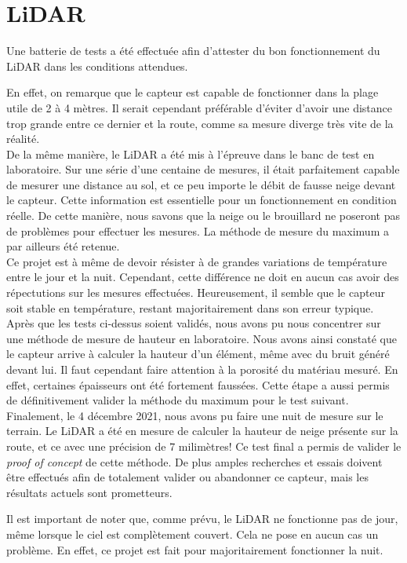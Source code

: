 \section{LiDAR}
Une batterie de tests a été effectuée afin d'attester du bon fonctionnement du LiDAR dans les conditions
attendues.\par
En effet, on remarque que le capteur est capable de fonctionner dans la plage utile de 2 à 
4 mètres. Il serait cependant préférable d'éviter d'avoir une distance trop grande entre ce dernier et 
la route, comme sa mesure diverge très vite de la réalité. \\
De la même manière, le LiDAR a été mis à l'épreuve dans le banc de test en laboratoire. Sur une série 
d'une centaine de mesures, il était parfaitement capable de mesurer une distance au sol, et ce peu importe 
le débit de fausse neige devant le capteur. Cette information est essentielle pour un fonctionnement en
condition réelle. De cette manière, nous savons que la neige ou le brouillard ne poseront pas de problèmes 
pour effectuer les mesures. La méthode de mesure du maximum a par ailleurs été retenue.\\
Ce projet est à même de devoir résister à de grandes variations de température entre le jour et
la nuit. Cependant, cette différence ne doit en aucun cas avoir des répectutions sur les mesures effectuées.
Heureusement, il semble que le capteur soit stable en température, restant majoritairement dans son 
erreur typique.\\
Après que les tests ci-dessus soient validés, nous avons pu nous concentrer sur une méthode de mesure de 
hauteur en laboratoire. Nous avons ainsi constaté que le capteur arrive à calculer la hauteur d'un élément,
même avec du bruit généré devant lui. Il faut cependant faire attention à la porosité du matériau mesuré. En
effet, certaines épaisseurs ont été fortement faussées. Cette étape a aussi permis de définitivement valider
la méthode du maximum pour le test suivant.\\
Finalement, le 4 décembre 2021, nous avons pu faire une nuit de mesure sur le terrain. Le LiDAR a été en
mesure de calculer la hauteur de neige présente sur la route, et ce avec une
précision de 7 milimètres! Ce test final a permis de valider le \emph{proof of concept} de cette méthode. De plus amples
recherches et essais doivent être effectués afin de totalement valider ou abandonner ce capteur, mais les
résultats actuels sont prometteurs.\par 
Il est important de noter que, comme prévu, le LiDAR ne fonctionne pas de jour, même lorsque le ciel
est complètement couvert. Cela ne pose en aucun cas un problème. En effet, ce projet est fait pour 
majoritairement fonctionner la nuit.

